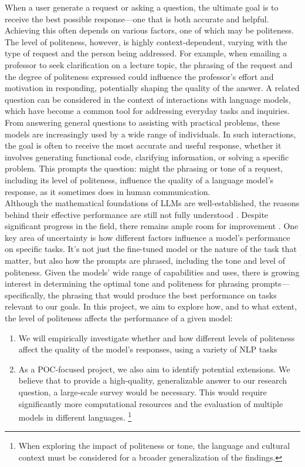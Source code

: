 \documentclass[11pt]{article}
\begin{document}
When a user generate a request or asking a question, the ultimate goal is to receive the best possible response—one that is both accurate and helpful. Achieving this often depends on various factors, one of which may be politeness. The level of politeness, however, is highly context-dependent, varying with the type of request and the person being addressed. For example, when emailing a professor to seek clarification on a lecture topic, the phrasing of the request and the degree of politeness expressed could influence the professor's effort and motivation in responding, potentially shaping the quality of the answer.
A related question can be considered in the context of interactions with language models, which have become a common tool for addressing everyday tasks and inquiries. From answering general questions to assisting with practical problems, these models are increasingly used by a wide range of individuals. In such interactions, the goal is often to receive the most accurate and useful response, whether it involves generating functional code, clarifying information, or solving a specific problem. This prompts the question: might the phrasing or tone of a request, including its level of politeness, influence the quality of a language model’s response, as it sometimes does in human communication. \\
Although the mathematical foundations of LLMs are well-established, the reasons behind their effective performance are still not fully understood \citep{lee24-potential-pragmatics}. Despite significant progress in the field, there remains ample room for improvement \citep{yin24-should-respect}. One key area of uncertainty is how different factors influence a model's performance on specific tasks. It's not just the fine-tuned model or the nature of the task that matter, but also how the prompts are phrased, including the tone and level of politeness. Given the models' wide range of capabilities and uses, there is growing interest in determining the optimal tone and politeness for phrasing prompts—specifically, the phrasing that would produce the best performance on tasks relevant to our goals.
In this project, we aim to explore how, and to what extent, the level of politeness affects the performance of a given model:

\begin{enumerate}
    \item We will empirically investigate whether and how different levels of politeness affect the quality of the model's responses, using a variety of NLP tasks

    \item As a POC-focused project, we also aim to identify potential extensions. We believe that to provide a high-quality, generalizable answer to our research question, a large-scale survey would be necessary. This would require significantly more computational resources and the evaluation of multiple models in different languages. \footnote{When exploring the impact of politeness or tone, the language and cultural context must be considered for a broader generalization of the findings.}
\end{enumerate}
\end{document}
